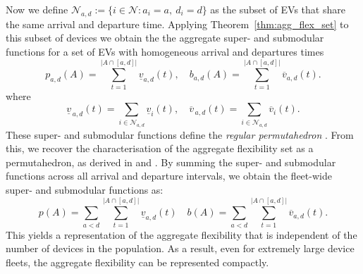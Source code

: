 Now we define $ \mathcal{N}_{a,d} := \{i\in\mathcal{N} : a_i = a,\ d_i = d\}$ as the subset of EVs that share the same arrival and departure time. 
Applying Theorem~\ref{thm:agg_flex_set} to this subset of devices we obtain the the aggregate super- and submodular functions for a set of EVs with homogeneous arrival and departures times
\begin{equation}\label{eq:ev_v_rep}
  p_{a,d}(A) = \sum_{t=1}^{\lvert A\cap [a,d]|} \underline v_{a,d}(t),
  \quad
  b_{a,d}(A) = \sum_{t=1}^{\lvert A\cap [a,d]|} \overline v_{a,d}(t).
\end{equation}
where
\[
  \underline v_{\,a,d}(t) = \sum_{i\in\mathcal{N}_{a,d}} \underline v_i(t),
  \quad
  \overline v_{\,a,d}(t)=\sum_{i\in\mathcal{N}_{a,d}} \overline v_i(t).
\]
These super- and submodular functions define the \textit{regular permutahedron} \cite{Postnikov2009PermutohedraBeyond}. From this, we recover the characterisation of the aggregate flexibility set as a permutahedron, as derived in \cite{Mukhi2023AnVehicles} and \cite{Panda2024EfficientVehicles}. By summing the super- and submodular functions across all arrival and departure intervals, we obtain the fleet-wide super- and submodular functions as:
\begin{equation}\label{eq:V1G_aggregate_permutahedra}
    p(A) = \sum_{a < d}\sum_{t=1}^{\lvert A\cap [a,d]|} \underline v_{a,d}(t)
    \quad
    b(A) = \sum_{a < d}\sum_{t=1}^{\lvert A\cap [a,d]|} \overline v_{a,d}(t).
\end{equation}
This yields a representation of the  aggregate flexibility that is independent of the number of devices in the population. As a result, even for extremely large device fleets, the aggregate flexibility can be represented compactly.

